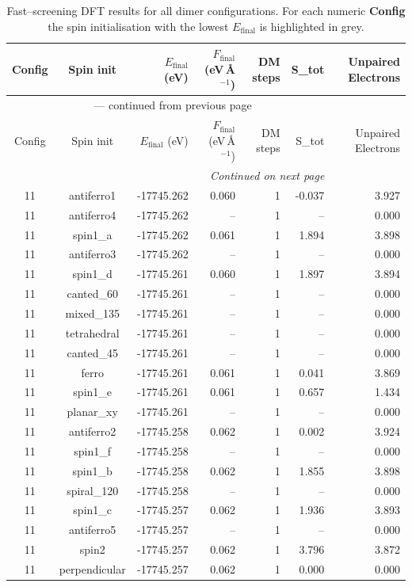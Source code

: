 
\begin{longtable}{@{}ccrrrrr@{}}
\caption{Fast–screening DFT results for all dimer configurations.
         For each numeric \textbf{Config} the spin initialisation with the
         lowest $E_{\mathrm{final}}$ is highlighted in grey.}\label{tab:dimer_full}\\
\toprule
Config & Spin init & $E_{\mathrm{final}}$ (eV) &
$F_{\mathrm{final}}$ (eV\,\AA$^{-1}$) & DM steps & S_{tot} & Unpaired Electrons\\
\midrule
\endfirsthead
\multicolumn{6}{c}{{\tablename}~\thetable{} — continued from previous page}\\
\toprule
Config & Spin init & $E_{\mathrm{final}}$ (eV) &
$F_{\mathrm{final}}$ (eV\,\AA$^{-1}$) & DM steps & S_{tot} & Unpaired Electrons\\
\midrule
\endhead
\midrule
\multicolumn{6}{r}{\emph{Continued on next page}}\\
\endfoot
\bottomrule
\endlastfoot
\rowcolor{gray!20} 11 & antiferro1 & -17745.262 & 0.060 & 1 & -0.037 & 3.927 \\
11 & antiferro4 & -17745.262 & -- & 1 & -- & 0.000 \\
11 & spin1\_a & -17745.262 & 0.061 & 1 & 1.894 & 3.898 \\
11 & antiferro3 & -17745.262 & -- & 1 & -- & 0.000 \\
11 & spin1\_d & -17745.261 & 0.060 & 1 & 1.897 & 3.894 \\
11 & canted\_60 & -17745.261 & -- & 1 & -- & 0.000 \\
11 & mixed\_135 & -17745.261 & -- & 1 & -- & 0.000 \\
11 & tetrahedral & -17745.261 & -- & 1 & -- & 0.000 \\
11 & canted\_45 & -17745.261 & -- & 1 & -- & 0.000 \\
11 & ferro & -17745.261 & 0.061 & 1 & 0.041 & 3.869 \\
11 & spin1\_e & -17745.261 & 0.061 & 1 & 0.657 & 1.434 \\
11 & planar\_xy & -17745.261 & -- & 1 & -- & 0.000 \\
11 & antiferro2 & -17745.258 & 0.062 & 1 & 0.002 & 3.924 \\
11 & spin1\_f & -17745.258 & -- & 1 & -- & 0.000 \\
11 & spin1\_b & -17745.258 & 0.062 & 1 & 1.855 & 3.898 \\
11 & spiral\_120 & -17745.258 & -- & 1 & -- & 0.000 \\
11 & spin1\_c & -17745.257 & 0.062 & 1 & 1.936 & 3.893 \\
11 & antiferro5 & -17745.257 & -- & 1 & -- & 0.000 \\
11 & spin2 & -17745.257 & 0.062 & 1 & 3.796 & 3.872 \\
11 & perpendicular & -17745.257 & 0.062 & 1 & 0.000 & 0.000 \\
\end{longtable}
